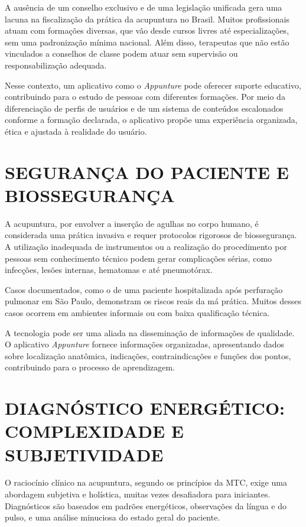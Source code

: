 A ausência de um conselho exclusivo e de uma legislação unificada gera uma lacuna na fiscalização da prática da acupuntura no Brasil. Muitos profissionais atuam com formações diversas, que vão desde cursos livres até especializações, sem uma padronização mínima nacional. Além disso, terapeutas que não estão vinculados a conselhos de classe podem atuar sem supervisão ou responsabilização adequada.

Nesse contexto, um aplicativo como o \textit{Appunture} pode oferecer suporte educativo, contribuindo para o estudo de pessoas com diferentes formações. Por meio da diferenciação de perfis de usuários e de um sistema de conteúdos escalonados conforme a formação declarada, o aplicativo propõe uma experiência organizada, ética e ajustada à realidade do usuário.

\section{SEGURANÇA DO PACIENTE E BIOSSEGURANÇA} \label{sec:seguranca}

A acupuntura, por envolver a inserção de agulhas no corpo humano, é considerada uma prática invasiva e requer protocolos rigorosos de biossegurança. A utilização inadequada de instrumentos ou a realização do procedimento por pessoas sem conhecimento técnico podem gerar complicações sérias, como infecções, lesões internas, hematomas e até pneumotórax.

Casos documentados, como o de uma paciente hospitalizada após perfuração pulmonar em São Paulo, demonstram os riscos reais da má prática. Muitos desses casos ocorrem em ambientes informais ou com baixa qualificação técnica.

A tecnologia pode ser uma aliada na disseminação de informações de qualidade. O aplicativo \textit{Appunture} fornece informações organizadas, apresentando dados sobre localização anatômica, indicações, contraindicações e funções dos pontos, contribuindo para o processo de aprendizagem.

\section{DIAGNÓSTICO ENERGÉTICO: COMPLEXIDADE E SUBJETIVIDADE} \label{sec:diagnostico}

O raciocínio clínico na acupuntura, segundo os princípios da MTC, exige uma abordagem subjetiva e holística, muitas vezes desafiadora para iniciantes. Diagnósticos são baseados em padrões energéticos, observações da língua e do pulso, e uma análise minuciosa do estado geral do paciente.

